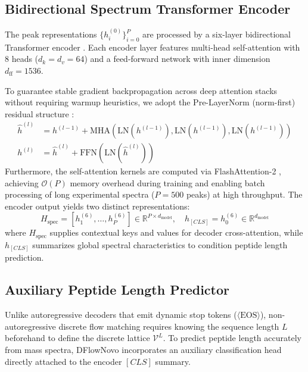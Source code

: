 \subsection{Bidirectional Spectrum Transformer Encoder}
\label{subsec:spectrum_encoder}

The peak representations $\{h_i^{(0)}\}_{i=0}^P$ are processed by a six-layer bidirectional Transformer encoder \citep{Vaswani2017}. Each encoder layer features multi-head self-attention with 8 heads ($d_k = d_v = 64$) and a feed-forward network with inner dimension $d_{\text{ff}} = 1536$.

To guarantee stable gradient backpropagation across deep attention stacks without requiring warmup heuristics, we adopt the Pre-LayerNorm (norm-first) residual structure \citep{Xiong2020}:
\begin{align}
\hat{h}^{(l)} &= h^{(l-1)} + \text{MHA}\left( \text{LN}(h^{(l-1)}), \text{LN}(h^{(l-1)}), \text{LN}(h^{(l-1)}) \right) \\
h^{(l)} &= \hat{h}^{(l)} + \text{FFN}\left( \text{LN}(\hat{h}^{(l)}) \right)
\end{align}
Furthermore, the self-attention kernels are computed via FlashAttention-2 \citep{Dao2022}, achieving $\mathcal{O}(P)$ memory overhead during training and enabling batch processing of long experimental spectra ($P = 500$ peaks) at high throughput. The encoder output yields two distinct representations:
\begin{equation}
H_{\text{spec}} = [h_1^{(6)}, \dots, h_P^{(6)}] \in \mathbb{R}^{P \times d_{\text{model}}}, \quad h_{[CLS]} = h_0^{(6)} \in \mathbb{R}^{d_{\text{model}}}
\label{eq:spectrum_encoder_output}
\end{equation}
where $H_{\text{spec}}$ supplies contextual keys and values for decoder cross-attention, while $h_{[CLS]}$ summarizes global spectral characteristics to condition peptide length prediction.

\subsection{Auxiliary Peptide Length Predictor}
\label{subsec:length_classifier}

Unlike autoregressive decoders that emit dynamic stop tokens ($\langle\text{EOS}\rangle$), non-autoregressive discrete flow matching requires knowing the sequence length $L$ beforehand to define the discrete lattice $\mathcal{V}^L$. To predict peptide length accurately from mass spectra, DFlowNovo incorporates an auxiliary classification head directly attached to the encoder $[CLS]$ summary.

